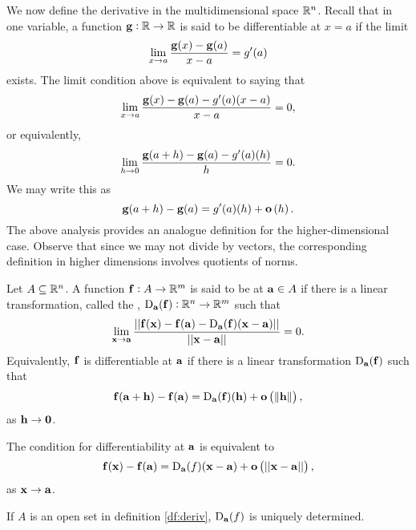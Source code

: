 \bigskip

We now define the derivative in the multidimensional space
$\mathbb{R}^n$. Recall that in one variable, a function $\mathbf{ g}:\mathbb{R}
\rightarrow \mathbb{R}$ is said to be differentiable at $x = a$ if the
limit
$$\lim_{x \rightarrow a} \dfrac{\mathbf{ g}(x) - \mathbf{ g}(a)}{x - a} =
g'(a)$$exists.  The limit condition above is equivalent to saying
that
$$\lim_{x \rightarrow a} \dfrac{\mathbf{ g}(x) - \mathbf{ g}(a) - g'(a)(x - a)}{x - a} =
0,$$ or equivalently,
$$\lim_{h \rightarrow 0} \dfrac{\mathbf{ g}(a + h) - \mathbf{ g}(a) - g'(a)(h)}{h} =
0.$$  We may write this as
$$\mathbf{ g}(a + h) - \mathbf{ g}(a) = g'(a)(h) + {\mathbf o}\left(h\right).$$
The above analysis provides an analogue definition for the
higher-dimensional case. Observe that since we may not divide by
vectors, the corresponding definition in higher dimensions
involves quotients of norms.
\begin{df}
Let $A\subseteq \mathbb{R}^n$. A function $\mathbf{ f}:A \rightarrow \mathbb{R}^m$ is
said to be  at ${\mathbf a}\in A$ if there is a
linear transformation, called the , ${\mathrm{D}}_{{\mathbf a}}(\mathbf{ f}):\mathbb{R}^n \rightarrow \mathbb{R}^m$ such that
$$\lim _{{\mathbf x}\rightarrow{\mathbf a}} \dfrac{||\mathbf{ f}({\mathbf x}) - \mathbf{ f}({\mathbf a}) - {\mathrm{D}}_{{\mathbf a}}(\mathbf{ f})({\mathbf x} - {\mathbf a})||}
{||{\mathbf x} - {\mathbf a}||} = 0.$$Equivalently, $\mathbf{ f}$ is
differentiable at ${\mathbf a}$ if there is a linear transformation
${\mathrm{D}}_{{\mathbf a}}(\mathbf{ f})$ such that
$$ \mathbf{ f}({\mathbf a} + {\mathbf h}) - \mathbf{ f}({\mathbf a})=  {\mathrm{D}}_{{\mathbf a}}(\mathbf{ f})({\mathbf h}) + {\mathbf o}\left({\left\|{\mathbf h}\right\|}\right),$$
as ${\mathbf h} \rightarrow {\mathbf 0}$.
 \label{df:deriv}\end{df}
\begin{rem}
The condition for differentiability at ${\mathbf a}$ is equivalent to
$$ \mathbf{ f}({\mathbf x}) - \mathbf{ f}({\mathbf a})=  {\mathrm{D}}_{{\mathbf a}}(f)({\mathbf x} - {\mathbf a}) + {\mathbf o}\left(||{\mathbf x} -
{\mathbf a}||\right),$$as ${\mathbf x} \rightarrow {\mathbf a}$.
\end{rem}
\begin{thm}
If $A$ is an open set in definition \ref{df:deriv}, ${\mathrm{D}}_{{\mathbf a}}(f)$
is uniquely determined.
\end{thm}
